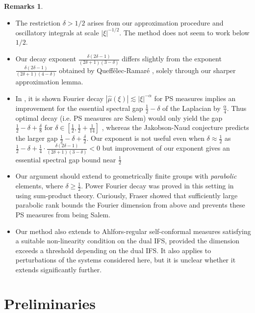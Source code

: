 \documentclass[12pt]{amsart}
\newcommand*\abs[1]{
	\left|#1\right|
}
\theoremstyle{definition}
\newtheorem*{rems}{Remarks}
\begin{document}
\begin{rems} 
\begin{itemize}
\item[(1)] The restriction $\delta>1/2$ arises from our approximation procedure and oscillatory integrals at scale $\abs{\xi}^{-1/2}$. The method does not seem to work below $1/2$.

\item[(2)] Our decay exponent $\frac{\delta(2\delta-1)}{(2\delta+1)(3-\delta)}$ differs slightly from the exponent $\frac{\delta(2\delta-1)}{(2\delta+1)(4-\delta)}$ obtained by Queff\'elec-Ramar\'e \cite{QueffelecRamare}, solely through our sharper approximation lemma.

\item[(3)] In \cite{DyatlovZahl,BD}, it is shown Fourier decay $|\widehat{\mu}(\xi)|\lesssim |\xi|^{-\alpha}$ for PS measures implies an improvement for the essential spectral gap $\frac12-\delta$ of the Laplacian by $\frac{\alpha}{4}$. Thus optimal decay (i.e. PS measures are Salem) would only yield the gap $\frac12-\delta+\frac{\delta}{8}$ for $\delta \in [\frac{1}{2},\frac{1}{2} + \frac{1}{14}]$ \cite{BD}, whereas the Jakobson-Naud conjecture \cite[Conjecture 2]{JakobsonNaud} predicts the larger gap $\frac12-\delta+\frac{\delta}{2}$. Our exponent is not useful even when $\delta\approx\frac12$ as $\frac12-\delta+\frac14\cdot\frac{\delta(2\delta-1)}{(2\delta+1)(3-\delta)}<0$ but improvement of our exponent gives an essential spectral gap bound near $\frac{1}{2}$

\item[(4)] Our argument should extend to geometrically finite groups with \textit{parabolic} elements, where $\delta\ge\frac12$. Power Fourier decay was proved in this setting in \cite{LeclercPaukkonenSahlsten} using sum-product theory. Curiously, Fraser showed that sufficiently large parabolic rank bounds the Fourier dimension from above \cite{Fraser} and prevents these PS measures from being Salem.

\item[(5)] Our method also extends to Ahlfors-regular self-conformal measures satisfying a suitable non-linearity condition on the dual IFS, provided the dimension exceeds a threshold depending on the dual IFS. It also applies to perturbations of the systems considered here, but it is unclear whether it extends significantly further.
\end{itemize}
\end{rems}


\section{Preliminaries}
\end{document}
